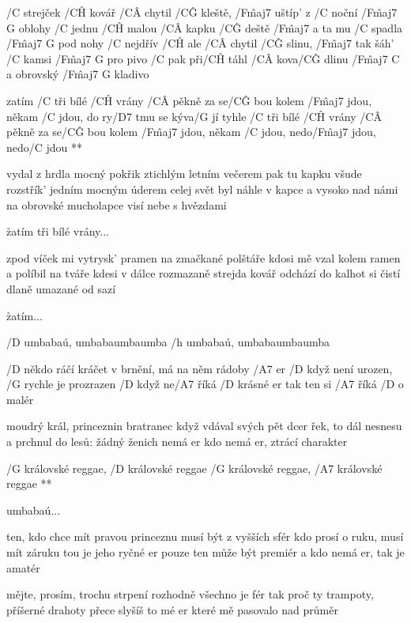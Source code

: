 
/C strejček /C\^H kovář /C\^A chytil /C\^G kleště, /F\^{maj7} uštíp' z /C noční /{F\^{maj7} G} oblohy
/C jednu /C\^H malou /C\^A kapku /C\^G deště /F\^{maj7} a ta mu /C spadla /{F\^{maj7} G} pod nohy
/C nejdřív /C\^H ale /C\^A chytil /C\^G slinu, /F\^{maj7} tak šáh' /C kamsi /{F\^{maj7} G} pro pivo
/C pak při/C\^H táhl /C\^A kova/C\^G dlinu /{F\^{maj7} C} a obrovský /{F\^{maj7} G} kladivo

\R  zatím /C tři bílé /C\^H vrány /C\^A pěkně za se/C\^G bou
    kolem /F\^{maj7} jdou, někam /C jdou, do ry/D7 tmu se kýva/G jí
    tyhle /C tři bílé /C\^H vrány /C\^A pěkně za se/C\^G bou
    kolem /F\^{maj7} jdou, někam /C jdou, nedo/F\^{maj7} jdou, nedo/C jdou **

vydal z hrdla mocný pokřik ztichlým letním večerem
pak tu kapku všude rozstřík' jedním mocným úderem
celej svět byl náhle v kapce a vysoko nad námi
na obrovské mucholapce visí nebe s hvězdami

\r zatím tři bílé vrány...

zpod víček mi vytrysk' pramen na zmačkané polštáře
kdosi mě vzal kolem ramen a políbil na tváře
kdesi v dálce rozmazaně strejda kovář odchází
do kalhot si čistí dlaně umazané od sazí

\r zatím...




/D umbabaú, umbabaumbaumba
/h umbabaú, umbabaumbaumba \s

/D někdo ráčí kráčet v brnění, má na něm rádoby /A7 er
/D když není urozen, /G  rychle je prozrazen
/D když ne/A7 říká /D krásné er
tak ten si /A7 říká /D o malér \s

moudrý král, princeznin bratranec
když vdával svých pět dcer
řek, to dál nesnesu a prchnul do lesů:
žádný ženich nemá er
kdo nemá er, ztrácí charakter

\R /G královské reggae, /D královské reggae
   /G královské reggae, /A7 královské reggae **

umbabaú... \s

ten, kdo chce mít pravou princeznu
musí být z vyšších sfér
kdo prosí o ruku, musí mít záruku
tou je jeho ryčné er
pouze ten může být premiér
a kdo nemá er, tak je amatér \s

mějte, prosím, trochu strpení
rozhodně všechno je fér
tak proč ty trampoty, příšerné drahoty
přece slyšíš to mé er
které mě pasovalo nad průměr


